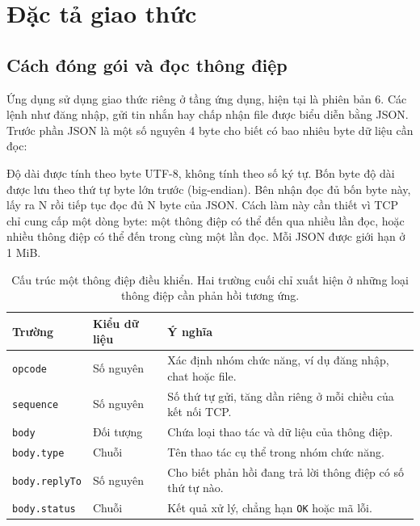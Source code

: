 \section{Đặc tả giao thức}
\begingroup
{}

\subsection{Cách đóng gói và đọc thông điệp}

Ứng dụng sử dụng giao thức riêng ở tầng ứng dụng, hiện tại là phiên bản 6.
Các lệnh như đăng nhập, gửi tin nhắn hay chấp nhận file được biểu diễn bằng JSON.
Trước phần JSON là một số nguyên 4 byte cho biết có bao nhiêu byte dữ liệu cần đọc:

\begin{center}
\end{center}

Độ dài được tính theo byte UTF-8, không tính theo số ký tự. Bốn byte độ dài được
lưu theo thứ tự byte lớn trước (big-endian). Bên nhận đọc đủ bốn byte này, lấy
ra N rồi tiếp tục đọc đủ N byte của JSON. Cách làm này cần thiết vì TCP chỉ cung
cấp một dòng byte: một thông điệp có thể đến qua nhiều lần đọc, hoặc nhiều
thông điệp có thể đến trong cùng một lần đọc. Mỗi JSON được giới hạn ở 1 MiB.

\begin{table}[H]
\centering\small
\begin{tabularx}{\linewidth}{p{3.1cm} p{2cm} >{\raggedright\arraybackslash}X}
\toprule
Trường & Kiểu dữ liệu & Ý nghĩa \\
\midrule
\texttt{opcode} & Số nguyên & Xác định nhóm chức năng, ví dụ đăng nhập, chat hoặc file. \\
\texttt{sequence} & Số nguyên & Số thứ tự gửi, tăng dần riêng ở mỗi chiều của kết nối TCP. \\
\texttt{body} & Đối tượng & Chứa loại thao tác và dữ liệu của thông điệp. \\
\texttt{body.type} & Chuỗi & Tên thao tác cụ thể trong nhóm chức năng. \\
\texttt{body.replyTo} & Số nguyên & Cho biết phản hồi đang trả lời thông điệp có số thứ tự nào. \\
\texttt{body.status} & Chuỗi & Kết quả xử lý, chẳng hạn \texttt{OK} hoặc mã lỗi. \\
\bottomrule
\end{tabularx}
\caption{Cấu trúc một thông điệp điều khiển. Hai trường cuối chỉ xuất hiện ở những loại thông điệp cần phản hồi tương ứng.}
\end{table}

